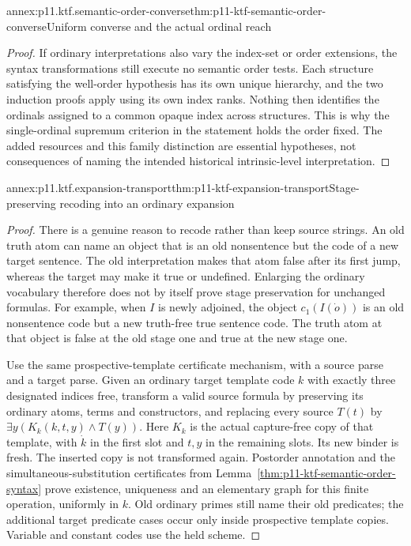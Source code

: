 \begin{annexitem}{annex:p11.ktf.semantic-order-converse}{thm:p11-ktf-semantic-order-converse}{Uniform converse and the actual ordinal reach}
\begin{proof}
If ordinary interpretations also vary the index-set or order
extensions, the syntax transformations still execute no semantic
order tests. Each structure satisfying the well-order hypothesis
has its own unique hierarchy, and the two induction proofs apply
using its own index ranks. Nothing then identifies the ordinals
assigned to a common opaque index across structures. This is why
the single-ordinal supremum criterion in the statement holds the
order fixed. The added resources and this family distinction are
essential hypotheses, not consequences of naming the intended
historical intrinsic-level interpretation.
\end{proof}
\end{annexitem}

\begin{annexitem}{annex:p11.ktf.expansion-transport}{thm:p11-ktf-expansion-transport}{Stage-preserving recoding into an ordinary expansion}
\begin{proof}
There is a genuine reason to recode rather than keep source strings.
An old truth atom can name an object that is an old nonsentence but
the code of a new target sentence. The old interpretation makes
that atom false after its first jump, whereas the target may make
it true or undefined. Enlarging the ordinary vocabulary therefore
does not by itself prove stage preservation for unchanged formulas.
For example, when \(I\) is newly adjoined, the object
\(c_1(I(\dot o))\) is an old nonsentence code but a new
truth-free true sentence code. The truth atom at that object is
false at the old stage one and true at the new stage one.

Use the same prospective-template certificate mechanism, with a
source parse and a target parse. Given an ordinary target template
code \(k\) with exactly three designated indices free, transform
a valid source formula by preserving its ordinary atoms, terms and
constructors, and replacing every source \(T(t)\) by
\(\exists y(K_k(k,t,y)\land T(y))\). Here \(K_k\)
is the actual capture-free copy of that template, with \(\dot k\)
in the first slot and \(t,y\) in the remaining slots. Its
new binder is fresh. The inserted copy is not transformed again.
Postorder annotation and the simultaneous-substitution certificates
from Lemma~\ref{thm:p11-ktf-semantic-order-syntax} prove existence,
uniqueness and an elementary graph for this finite operation, uniformly
in \(k\). Old ordinary primes still name their old predicates;
the additional target predicate cases occur only inside prospective
template copies. Variable and constant codes use the held scheme.


\end{proof}
\end{annexitem}
